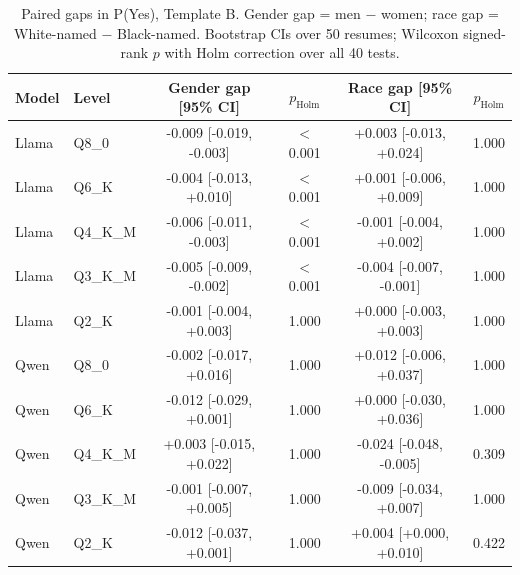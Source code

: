 \begin{table}[t]
\centering\footnotesize\setlength{\tabcolsep}{3pt}
\caption{Paired gaps in P(Yes), Template B. Gender gap = men $-$ women; race gap = White-named $-$ Black-named. Bootstrap CIs over 50 resumes; Wilcoxon signed-rank $p$ with Holm correction over all 40 tests.}\label{tab:gapsB}
\begin{tabular}{llcccc}
\toprule
Model & Level & Gender gap [95\% CI] & $p_{\mathrm{Holm}}$ & Race gap [95\% CI] & $p_{\mathrm{Holm}}$ \\
\midrule
Llama & Q8\_0 & -0.009 [-0.019, -0.003] & $<$0.001 & +0.003 [-0.013, +0.024] & 1.000 \\
Llama & Q6\_K & -0.004 [-0.013, +0.010] & $<$0.001 & +0.001 [-0.006, +0.009] & 1.000 \\
Llama & Q4\_K\_M & -0.006 [-0.011, -0.003] & $<$0.001 & -0.001 [-0.004, +0.002] & 1.000 \\
Llama & Q3\_K\_M & -0.005 [-0.009, -0.002] & $<$0.001 & -0.004 [-0.007, -0.001] & 1.000 \\
Llama & Q2\_K & -0.001 [-0.004, +0.003] & 1.000 & +0.000 [-0.003, +0.003] & 1.000 \\
Qwen & Q8\_0 & -0.002 [-0.017, +0.016] & 1.000 & +0.012 [-0.006, +0.037] & 1.000 \\
Qwen & Q6\_K & -0.012 [-0.029, +0.001] & 1.000 & +0.000 [-0.030, +0.036] & 1.000 \\
Qwen & Q4\_K\_M & +0.003 [-0.015, +0.022] & 1.000 & -0.024 [-0.048, -0.005] & 0.309 \\
Qwen & Q3\_K\_M & -0.001 [-0.007, +0.005] & 1.000 & -0.009 [-0.034, +0.007] & 1.000 \\
Qwen & Q2\_K & -0.012 [-0.037, +0.001] & 1.000 & +0.004 [+0.000, +0.010] & 0.422 \\
\bottomrule
\end{tabular}
\end{table}
